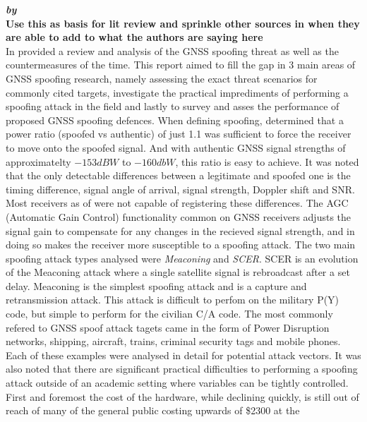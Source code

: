 \medskip

\textbf{\emph{ by \citeauthor{RN32}}} \\
\textbf{Use this as basis for lit review and sprinkle other sources in when they are able to add to what the authors are saying here} \\
In \citeyear{RN32} \citeauthor{RN32} \cite{RN32} provided a review and analysis of the GNSS spoofing threat as well as the countermeasures of the time. This report aimed
to fill the gap in 3 main areas of GNSS spoofing research, namely assessing the exact threat scenarios for commonly cited targets, investigate the practical imprediments
of performing a spoofing attack in the field and lastly to survey and asses the performance of proposed GNSS spoofing defences. When defining spoofing, \citeauthor{RN32}
determined that a power ratio (spoofed vs authentic) of just 1.1 was sufficient to force the receiver to move onto the spoofed signal. And with authentic GNSS signal
strengths of approximatelty $-153dBW$ to $-160dbW$, this ratio is easy to achieve.  It was noted that the
only detectable differences between a legitimate and spoofed one is the timing difference, signal angle of arrival, signal strength, Doppler shift and SNR. Most receivers
as of \citeyear{RN32} were not capable of registering these differences. The AGC (Automatic Gain Control) functionality common on GNSS receivers adjusts the signal gain
to compensate for any changes in the recieved signal strength, and in doing so makes the receiver more susceptible to a spoofing attack. The two main spoofing attack
types analysed were \emph{Meaconing} and \emph{SCER}. SCER is an evolution of the Meaconing attack where a single satellite signal is rebroadcast after a set delay.
Meaconing is the simplest spoofing attack and is a capture and retransmission attack. This attack is difficult to perfom on the military P(Y) code, but simple to perform
for the civilian C/A code. The most commonly refered to GNSS spoof attack tagets came in the form of Power Disruption networks, shipping, aircraft, trains, criminal
security tags and mobile phones. Each of these examples were analysed in detail for potential attack vectors.
It was also noted that there are significant practical difficulties to performing a spoofing attack outside of an academic setting where variables can be tightly
controlled. First and foremost the cost of the hardware, while declining quickly, is still out of reach of many of the general public costing upwards of \$2300 at the
